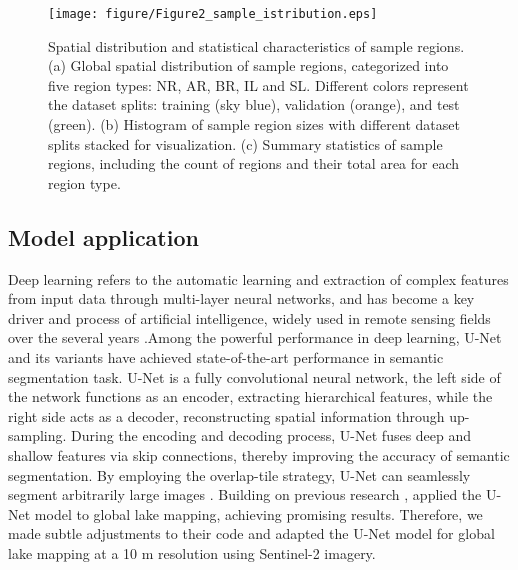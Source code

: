 \documentclass[preprint,12pt,authoryear]{elsarticle}
\begin{document}
\begin{figure}[h]
    \centering
    \texttt{[image: figure/Figure2\_sample\_istribution.eps]}
    \caption{Spatial distribution and statistical characteristics of sample regions. (a) Global spatial distribution of sample regions, categorized into five region types: NR, AR, BR, IL and SL. Different colors represent the dataset splits: training (sky blue), validation (orange), and test (green). (b) Histogram of sample region sizes with different dataset splits stacked for visualization. (c) Summary statistics of sample regions, including the count of regions and their total area for each region type.}
    \label{fig:Fig2}
\end{figure}

\subsection{Model application}
\label{subsec3}

Deep learning refers to the automatic learning and extraction of complex features from input data through multi-layer neural networks, and has become a key driver and process of artificial intelligence, widely used in remote sensing fields over the several years \citep{brandt_unexpectedly_2020}.Among the powerful performance in deep learning, U-Net \citep{ronneberger_u-net_2015} and its variants have achieved state-of-the-art performance in semantic segmentation task. U-Net is a fully convolutional neural network, the left side of the network functions as an encoder, extracting hierarchical features, while the right side acts as a decoder, reconstructing spatial information through up-sampling. During the encoding and decoding process, U-Net fuses deep and shallow features via skip connections, thereby improving the accuracy of semantic segmentation. By employing the overlap-tile strategy, U-Net can seamlessly segment arbitrarily large images \citep{ronneberger_u-net_2015}. Building on previous research \citep{brandt_unexpectedly_2020}, \citet{pi_mapping_2022} applied the U-Net model to global lake mapping, achieving promising results. Therefore, we made subtle adjustments to their code and adapted the U-Net model for global lake mapping at a 10 m resolution using Sentinel-2 imagery.
\end{document}
